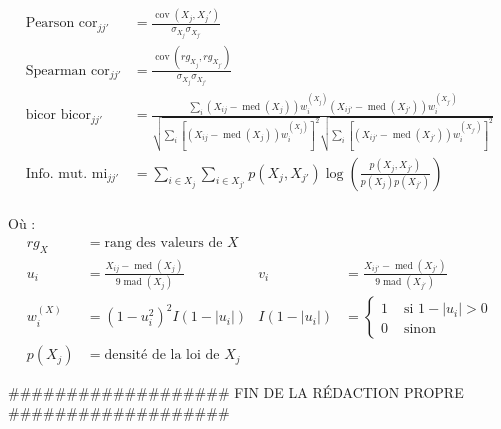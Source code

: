 \begin{align} 
    \text{Pearson  } \operatorname{cor}_{jj'} & = \frac{\operatorname{cov}(X_j,X_j')}{\sigma_{X_{j}} \sigma_{X_{j'}}} \label{simscore_base_pearson} \\
    \text{Spearman  } \operatorname{cor}_{jj'} & = \frac{\operatorname{cov}(rg_{X_j},rg_{X_{j'}})}{\sigma_{X_j}\sigma_{X_{j'}}} \label{simscore_base_spearman} \\
    \text{bicor  } \operatorname{bicor}_{jj'} & = \frac{\underset{i}{\sum}\left(X_{ij}-\operatorname{med}(X_j)\right) w_{i}^{(X_{j})}\left(X_{ij'}-\operatorname{med}(X_{j'})\right) w_{i}^{(X_{j'})}}{\sqrt{\underset{i}{\sum}\left[\left(X_{ij}-\operatorname{med}(X_{j})\right) w_{i}^{(X_j)}\right]^{2}} \sqrt{\underset{i}{\sum}\left[\left(X_{ij'}-\operatorname{med}(X_{j'})\right) w_{i}^{(X_{j'})}\right]^{2}}} \label{simscore_base_bicor} \\
    \text{Info. mut.  } \operatorname{mi}_{jj'} & = \sum_{i \in X_{j}} \sum_{i \in X_{j'}} p(X_j, X_{j'}) \log \left(\frac{p(X_j, X_{j'})}{p(X_j) p(X_{j'})}\right) \label{simscore_base_mi} 
\end{align} \\
Où :
\begin{align*}
    rg_X &= \text{rang des valeurs de } X \\
    u_{i} &=\frac{X_{ij}-\operatorname{med}(X_{j})}{9 \operatorname{mad}(X_{j})}   &
    v_{i} &=\frac{X_{ij'}-\operatorname{med}(X_{j'})}{9 \operatorname{mad}(X_{j'})} \\    
    w_{i}^{(X)} &= \left(1-u_{i}^{2}\right)^{2} I\left(1-\left|u_{i}\right|\right)   &
    I\left(1-\left|u_{i}\right|\right) &= \begin{cases}1 & \text{ si } 1-\left|u_{i}\right| > 0 \\ 0 & \text{ sinon}\end{cases} \\ 
    p(X_j) & = \text{densité de la loi de } X_j
\end{align*}

\#\#\#\#\#\#\#\#\#\#\#\#\#\#\#\#\#\#\# FIN DE LA RÉDACTION PROPRE \#\#\#\#\#\#\#\#\#\#\#\#\#\#\#\#\#\#\#


